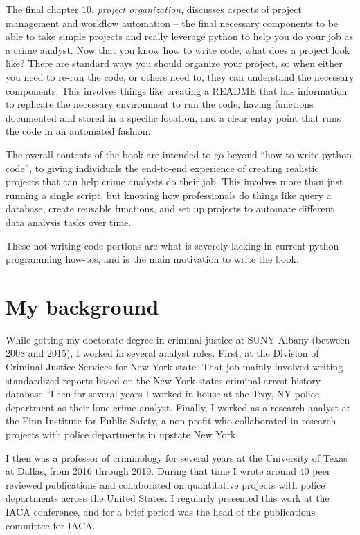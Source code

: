 \documentclass[
  letterpaper,
]{scrbook}
\begin{document}
The final chapter 10, \emph{project organization}, discusses aspects of
project management and workflow automation -- the final necessary
components to be able to take simple projects and really leverage python
to help you do your job as a crime analyst. Now that you know how to
write code, what does a project look like? There are standard ways you
should organize your project, so when either you need to re-run the
code, or others need to, they can understand the necessary components.
This involves things like creating a README that has information to
replicate the necessary environment to run the code, having functions
documented and stored in a specific location, and a clear entry point
that runs the code in an automated fashion.

The overall contents of the book are intended to go beyond ``how to
write python code'', to giving individuals the end-to-end experience of
creating realistic projects that can help crime analysts do their job.
This involves more than just running a single script, but knowing how
professionals do things like query a database, create reusable
functions, and set up projects to automate different data analysis tasks
over time.

These not writing code portions are what is severely lacking in current
python programming how-tos, and is the main motivation to write the
book.

\section*{My background}\label{my-background}


While getting my doctorate degree in criminal justice at SUNY Albany
(between 2008 and 2015), I worked in several analyst roles. First, at
the Division of Criminal Justice Services for New York state. That job
mainly involved writing standardized reports based on the New York
states criminal arrest history database. Then for several years I worked
in-house at the Troy, NY police department as their lone crime analyst.
Finally, I worked as a research analyst at the Finn Institute for Public
Safety, a non-profit who collaborated in research projects with police
departments in upstate New York.

I then was a professor of criminology for several years at the
University of Texas at Dallas, from 2016 through 2019. During that time
I wrote around 40 peer reviewed publications and collaborated on
quantitative projects with police departments across the United States.
I regularly presented this work at the IACA conference, and for a brief
period was the head of the publications committee for IACA.
\end{document}
